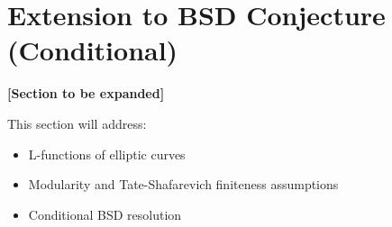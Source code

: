 \section{Extension to BSD Conjecture (Conditional)}
\label{sec:bsd}

\textbf{[Section to be expanded]}

This section will address:
\begin{itemize}
\item L-functions of elliptic curves
\item Modularity and Tate-Shafarevich finiteness assumptions
\item Conditional BSD resolution
\end{itemize}
